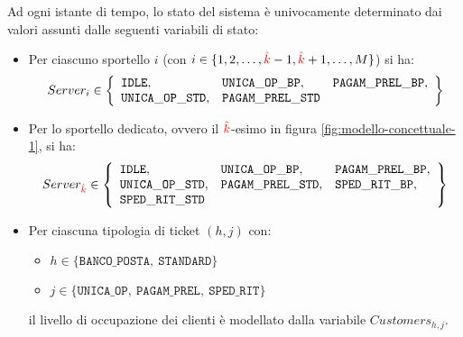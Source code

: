Ad ogni istante di tempo, lo stato del sistema è univocamente determinato dai valori assunti dalle seguenti variabili di stato:
\begin{itemize}
\item Per ciascuno sportello $i$ (con $i \in \lbrace 1, 2, \dots, {\color{red}\hat{k}}-1, {\color{red}\hat{k}}+1, \dots, M \rbrace$) si ha:
\begin{equation}
Server_i \in
\left\lbrace
\begin{array}{l l l}
\mathtt{IDLE}, & \mathtt{UNICA\_OP\_BP}, & \mathtt{PAGAM\_PREL\_BP},\\ 
\mathtt{UNICA\_OP\_STD}, & \mathtt{PAGAM\_PREL\_STD}
\end{array}
\right\rbrace
\end{equation}
\item Per lo sportello dedicato, ovvero il ${\color{red}\hat{k}}$-esimo in figura \ref{fig:modello-concettuale-1}, si ha:
\begin{equation}
Server_{\color{red}\hat{k}} \in 
\left\lbrace
\begin{array}{l l l}
\mathtt{IDLE}, & \mathtt{UNICA\_OP\_BP}, & \mathtt{PAGAM\_PREL\_BP},\\ 
\mathtt{UNICA\_OP\_STD}, & \mathtt{PAGAM\_PREL\_STD}, & \mathtt{SPED\_RIT\_BP},\\\mathtt{SPED\_RIT\_STD}
\end{array}
\right\rbrace
\end{equation}
\item Per ciascuna tipologia di ticket $(h, j)$ con:
\begin{itemize}
\item $h \in \lbrace \mathtt{BANCO\_POSTA},\ \mathtt{STANDARD}\rbrace$
\item $j \in \lbrace \mathtt{UNICA\_OP},\ \mathtt{PAGAM\_PREL},\ \mathtt{SPED\_RIT} \rbrace$
\end{itemize}
il livello di occupazione dei clienti è modellato dalla variabile $Customers_{h,j}$.
\end{itemize}

